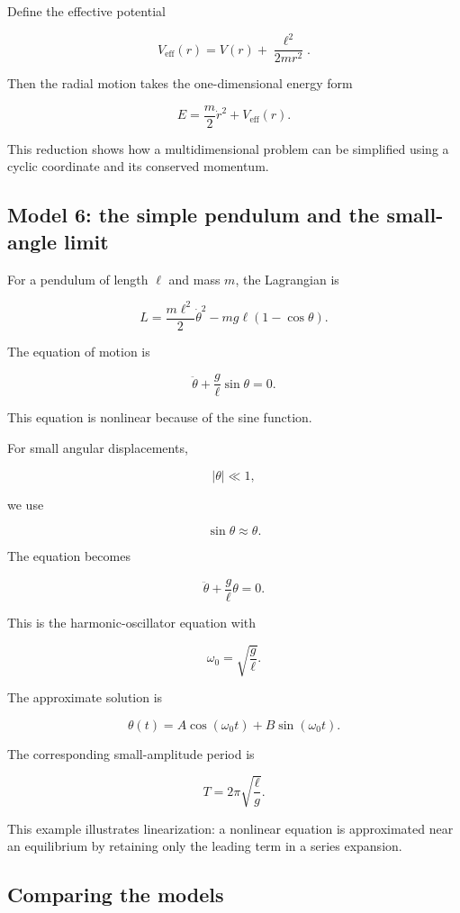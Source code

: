 Define the effective potential

\[
\boxed{
V_{\mathrm{eff}}(r)
=
V(r)
+
\frac{\ell^{2}}{2mr^{2}}
}.
\]

Then the radial motion takes the one-dimensional energy form

\[
E
=
\frac{m}{2}\dot r^{2}
+
V_{\mathrm{eff}}(r).
\]

This reduction shows how a multidimensional problem can be simplified using a cyclic coordinate and its conserved momentum.

\subsection{Model 6: the simple pendulum and the small-angle limit}

For a pendulum of length \(\ell\) and mass \(m\), the Lagrangian is

\[
L
=
\frac{m\ell^{2}}{2}\dot\theta^{2}
-
mg\ell(1-\cos\theta).
\]

The equation of motion is

\[
\boxed{
\ddot\theta
+
\frac{g}{\ell}
\sin\theta
=0
}.
\]

This equation is nonlinear because of the sine function.

For small angular displacements,

\[
|\theta|\ll 1,
\]

we use

\[
\sin\theta
\approx
\theta.
\]

The equation becomes

\[
\ddot\theta
+
\frac{g}{\ell}\theta
=0.
\]

This is the harmonic-oscillator equation with

\[
\omega_{0}
=
\sqrt{\frac{g}{\ell}}.
\]

The approximate solution is

\[
\boxed{
\theta(t)
=
A\cos(\omega_{0}t)
+
B\sin(\omega_{0}t)
}.
\]

The corresponding small-amplitude period is

\[
\boxed{
T
=
2\pi
\sqrt{\frac{\ell}{g}}
}.
\]

This example illustrates linearization: a nonlinear equation is approximated near an equilibrium by retaining only the leading term in a series expansion.

\subsection{Comparing the models}

